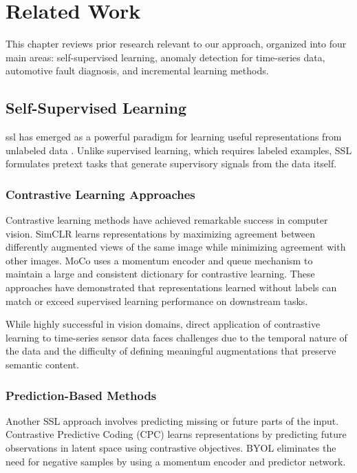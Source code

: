 \chapter{Related Work}
\label{chap:related_work}

This chapter reviews prior research relevant to our approach, organized into four main areas: self-supervised learning, anomaly detection for time-series data, automotive fault diagnosis, and incremental learning methods.

\section{Self-Supervised Learning}

\gls{ssl} has emerged as a powerful paradigm for learning useful representations from unlabeled data \parencite{lecun2015deep}. Unlike supervised learning, which requires labeled examples, SSL formulates pretext tasks that generate supervisory signals from the data itself.

\subsection{Contrastive Learning Approaches}

Contrastive learning methods have achieved remarkable success in computer vision. SimCLR \parencite{chen2020simple} learns representations by maximizing agreement between differently augmented views of the same image while minimizing agreement with other images. MoCo \parencite{he2020momentum} uses a momentum encoder and queue mechanism to maintain a large and consistent dictionary for contrastive learning. These approaches have demonstrated that representations learned without labels can match or exceed supervised learning performance on downstream tasks.

While highly successful in vision domains, direct application of contrastive learning to time-series sensor data faces challenges due to the temporal nature of the data and the difficulty of defining meaningful augmentations that preserve semantic content.

\subsection{Prediction-Based Methods}

Another SSL approach involves predicting missing or future parts of the input. Contrastive Predictive Coding (CPC) \parencite{oord2018representation} learns representations by predicting future observations in latent space using contrastive objectives. BYOL \parencite{grill2020bootstrap} eliminates the need for negative samples by using a momentum encoder and predictor network.

